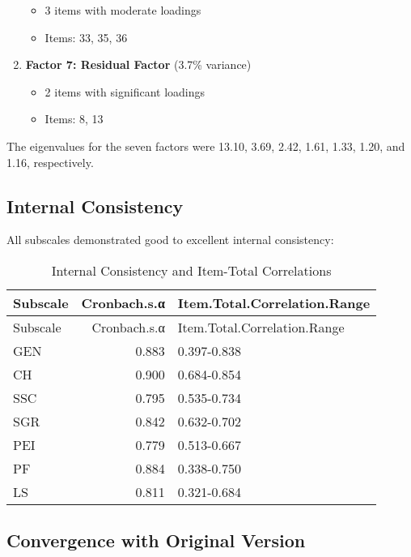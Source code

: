 \documentclass[man,floatsintext,12pt]{apa7}
\begin{document}
\begin{enumerate}
  \begin{itemize}
  \tightlist
  \item
    3 items with moderate loadings
  \item
    Items: 33, 35, 36
  \end{itemize}
\item
  \textbf{Factor 7: Residual Factor} (3.7\% variance)

  \begin{itemize}
  \tightlist
  \item
    2 items with significant loadings
  \item
    Items: 8, 13
  \end{itemize}
\end{enumerate}

The eigenvalues for the seven factors were 13.10, 3.69, 2.42, 1.61,
1.33, 1.20, and 1.16, respectively.

\subsection{Internal Consistency}\label{internal-consistency}

All subscales demonstrated good to excellent internal consistency:

\begin{longtable}[]{@{}lrl@{}}
\caption{Internal Consistency and Item-Total
Correlations}\tabularnewline
\toprule\noalign{}
Subscale & Cronbach.s.α & Item.Total.Correlation.Range \\
\midrule\noalign{}
\endfirsthead
\toprule\noalign{}
Subscale & Cronbach.s.α & Item.Total.Correlation.Range \\
\midrule\noalign{}
\endhead
\bottomrule\noalign{}
\endlastfoot
GEN & 0.883 & 0.397-0.838 \\
CH & 0.900 & 0.684-0.854 \\
SSC & 0.795 & 0.535-0.734 \\
SGR & 0.842 & 0.632-0.702 \\
PEI & 0.779 & 0.513-0.667 \\
PF & 0.884 & 0.338-0.750 \\
LS & 0.811 & 0.321-0.684 \\
\end{longtable}

\subsection{Convergence with Original
Version}\label{convergence-with-original-version}
\end{document}
